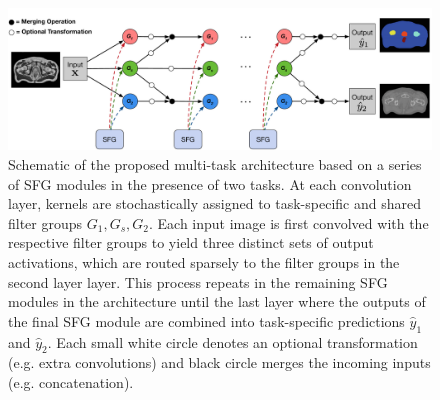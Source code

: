 \begin{figure}[ht]

    \center
	\includegraphics[width=\linewidth]{chapter_6/figures/schematic_03.pdf}
	\caption{\small Schematic of the proposed multi-task architecture based on a series of SFG modules in the presence of two tasks. At each convolution layer, kernels are stochastically assigned to task-specific and shared filter groups $G_{1}, G_{s}, G_{2}$. Each input image is first convolved with the respective filter groups to yield three distinct sets of output activations, which are routed sparsely to the filter groups in the second layer layer. This process repeats in the remaining SFG modules in the architecture until the last layer where the outputs of the final SFG module are combined into task-specific predictions $\hat{y}_{1}$ and $\hat{y}_{2}$. Each small white circle denotes an optional transformation (e.g. extra convolutions) and black circle merges the incoming inputs (e.g. concatenation).}
    \label{fig:schematic}
\end{figure}


